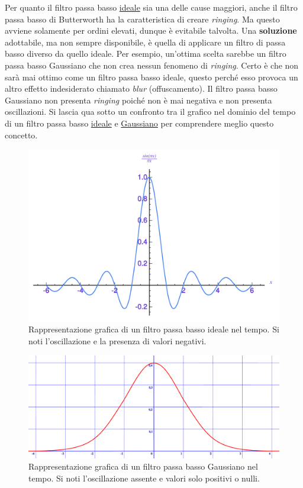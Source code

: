 \documentclass[a4paper]{article}
\begin{document}
\begin{itemize}
		\noindent
		Per quanto il filtro passa basso \underline{ideale} sia una delle cause maggiori, anche il filtro passa basso di Butterworth ha la caratteristica di creare \emph{ringing}. Ma questo avviene solamente per ordini elevati, dunque è evitabile talvolta.\newline
		Una \textbf{soluzione} adottabile, ma non sempre disponibile, è quella di applicare un filtro di passa basso diverso da quello ideale. Per esempio, un'ottima scelta sarebbe un filtro passa basso Gaussiano che non crea nessun fenomeno di \emph{ringing}. Certo è che non sarà mai ottimo come un filtro passa basso ideale, questo perché esso provoca un altro effetto indesiderato chiamato \emph{blur} (offuscamento).\newline
		Il filtro passa basso Gaussiano non presenta \emph{ringing} poiché non è mai negativa e non presenta oscillazioni. Si lascia qua sotto un confronto tra il grafico nel dominio del tempo di un filtro passa basso \underline{ideale} e \underline{Gaussiano} per comprendere meglio questo concetto.\newpage
		\begin{figure}[!htp]
			\centering
			\includegraphics[width=.8\textwidth]{img/filtro_passa_basso_ideale.pdf}
			\caption*{Rappresentazione grafica di un filtro passa basso ideale nel tempo. Si noti l'oscillazione e la presenza di valori negativi.}
		\end{figure}
		
		\begin{figure}[!htp]
			\centering
			\includegraphics[width=.8\textwidth]{img/gaussiana.pdf}
			\caption*{Rappresentazione grafica di un filtro passa basso Gaussiano nel tempo. Si noti l'oscillazione assente e valori solo positivi o nulli.}
		\end{figure}\newpage
	

\end{itemize}
\end{document}
